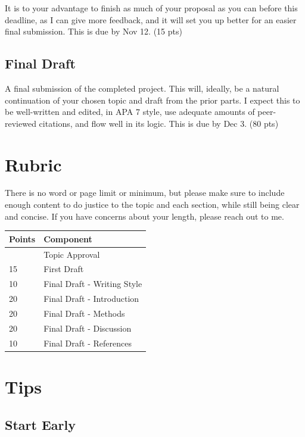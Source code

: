 \documentclass[
  12pt,
  letterpaper,
]{scrartcl}
\begin{document}
It is to your advantage to finish as much of your proposal as you can
before this deadline, as I can give more feedback, and it will set you
up better for an easier final submission. This is due by Nov 12. (15
pts)

\subsection{Final Draft}\label{final-draft}

A final submission of the completed project. This will, ideally, be a
natural continuation of your chosen topic and draft from the prior
parts. I expect this to be well-written and edited, in APA 7 style, use
adequate amounts of peer-reviewed citations, and flow well in its logic.
This is due by Dec 3. (80 pts)

\section{Rubric}\label{rubric}

There is no word or page limit or minimum, but please make sure to
include enough content to do justice to the topic and each section,
while still being clear and concise. If you have concerns about your
length, please reach out to me.

\begin{longtable}[]{@{}ll@{}}
\toprule\noalign{}
Points & Component \\
\midrule\noalign{}
\endhead
\bottomrule\noalign{}
\endlastfoot
5 & Topic Approval \\
15 & First Draft \\
10 & Final Draft - Writing Style \\
20 & Final Draft - Introduction \\
20 & Final Draft - Methods \\
20 & Final Draft - Discussion \\
10 & Final Draft - References \\
\end{longtable}

\section{Tips}\label{tips}

\subsection{Start Early}\label{start-early}
\end{document}
